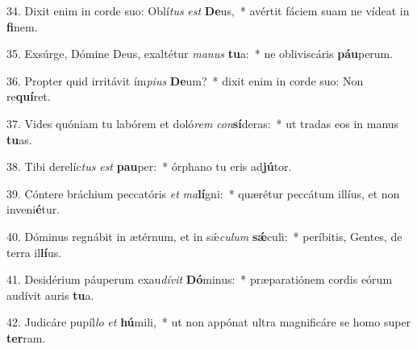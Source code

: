 34. Dixit enim in corde suo: Oblí\textit{tus} \textit{est} \textbf{De}us,~*  avértit fáciem suam ne vídeat in \textbf{fi}nem.\

35. Exsúrge, Dómine Deus, exaltétur \textit{ma}\textit{nus} \textbf{tu}a:~*  ne obliviscáris \textbf{páu}perum.\

36. Propter quid irritávit ím\textit{pi}\textit{us} \textbf{De}um?~*  dixit enim in corde suo: Non re\textbf{quí}ret.\

37. Vides quóniam tu labórem et doló\textit{rem} \textit{con}\textbf{sí}deras:~*  ut tradas eos in manus \textbf{tu}as.\

38. Tibi derelíc\textit{tus} \textit{est} \textbf{pau}per:~*  órphano tu eris ad\textbf{jú}tor.\

39. Cóntere bráchium peccatóris \textit{et} \textit{ma}\textbf{lí}gni:~*  quærétur peccátum illíus, et non inveni\textbf{é}tur.\

40. Dóminus regnábit in ætérnum, et in sǽ\textit{cu}\textit{lum} \textbf{sǽ}culi:~*  períbitis, Gentes, de terra il\textbf{lí}us.\

41. Desidérium páuperum exau\textit{dí}\textit{vit} \textbf{Dó}minus:~*  præparatiónem cordis eórum audívit auris \textbf{tu}a.\

42. Judicáre pupíl\textit{lo} \textit{et} \textbf{hú}mili,~*  ut non appónat ultra magnificáre se homo super \textbf{ter}ram.\

